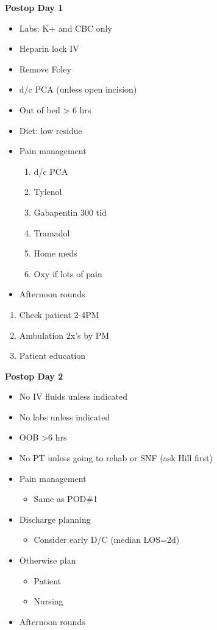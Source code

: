 \documentclass[
  letterpaper,
]{scrbook}
\providecommand{\tightlist}{%
  \setlength{\itemsep}{0pt}\setlength{\parskip}{0pt}}
\begin{document}
\textbf{Postop Day 1}

\begin{itemize}
\tightlist
\item
  Labs: K+ and CBC only
\item
  Heparin lock IV
\item
  Remove Foley
\item
  d/c PCA (unless open incision)
\item
  Out of bed \textgreater{} 6 hrs
\item
  Diet: low residue
\item
  Pain management

  \begin{enumerate}
  \def\labelenumi{\arabic{enumi})}
  \tightlist
  \item
    d/c PCA
  \item
    Tylenol
  \item
    Gabapentin 300 tid
  \item
    Tramadol
  \item
    Home meds
  \item
    Oxy if lots of pain
  \end{enumerate}
\item
  Afternoon rounds
\end{itemize}

\begin{enumerate}
\def\labelenumi{\arabic{enumi})}
\tightlist
\item
  Check patient 2-4PM
\item
  Ambulation 2x's by PM
\item
  Patient education
\end{enumerate}

\textbf{Postop Day 2}

\begin{itemize}
\tightlist
\item
  No IV fluids unless indicated
\item
  No labs unless indicated
\item
  OOB \textgreater6 hrs
\item
  No PT unless going to rehab or SNF (ask Hill first)
\item
  Pain management

  \begin{itemize}
  \tightlist
  \item
    Same as POD\#1
  \end{itemize}
\item
  Discharge planning

  \begin{itemize}
  \tightlist
  \item
    Consider early D/C (median LOS=2d)
  \end{itemize}
\item
  Otherwise plan

  \begin{itemize}
  \tightlist
  \item
    Patient
  \item
    Nursing
  \end{itemize}
\item
  Afternoon rounds
\end{itemize}
\end{document}
